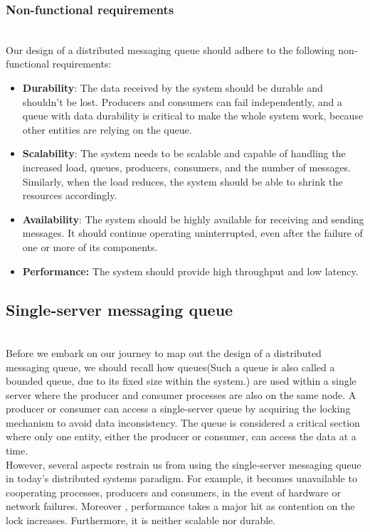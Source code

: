 \subsubsection{Non-functional requirements}\label{wHq2HcuSktQ-Twkr4ZYht}
\\
Our design of a distributed messaging queue should adhere to the following non-functional requirements:

\begin{itemize}
\item
\protect{}\label{MKospkOZGouADcZepOHvm}
\textbf{Durability}: The data received by the system should be durable and shouldn't be lost. Producers and consumers can fail independently, and a queue with data durability is critical to make the whole system work, because other entities are relying on the queue.
\item
\protect{}\label{R_i7PqRIrBQs11oOGnjlt}
\textbf{Scalability}: The system needs to be scalable and capable of handling the increased load, queues, producers, consumers, and the number of messages. Similarly, when the load reduces, the system should be able to shrink the resources accordingly.
\item
\protect{}\label{5UCr1MIzTW20lVscK37w1}
\textbf{Availability}: The system should be highly available for receiving and sending messages. It should continue operating uninterrupted, even after the failure of one or more of its components.
\item
\protect{}\label{P3Wd7oHBweivgneKwmFkj}
\textbf{Performance:} The system should provide high throughput and low latency.
\end{itemize}

\subsection{Single-server messaging queue}\label{V680K8ql0ZeaMPxrkpRHJ}
\\
Before we embark on our journey to map out the design of a distributed messaging queue, we should recall how queues(Such a queue is also called a bounded queue, due to its fixed size within the system.) are used within a single server where the producer and consumer processes are also on the same node. A producer or consumer can access a single-server queue by acquiring the locking mechanism to avoid data inconsistency. The queue is considered a critical section where only one entity, either the producer or consumer, can access the data at a time.
\\
However, several aspects restrain us from using the single-server messaging queue in today's distributed systems paradigm. For example, it becomes unavailable to cooperating processes, producers and consumers, in the event of hardware or network failures. Moreover , performance takes a major hit as contention on the lock increases. Furthermore, it is neither scalable nor durable.

